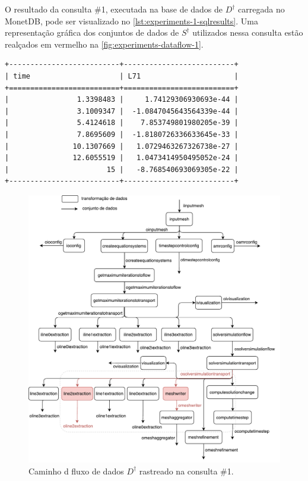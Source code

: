 O resultado da consulta \#1, executada na base de dados de \(D^{\dagger}\) carregada no MonetDB, pode ser visualizado no \autoref{lst:experiments-1-sqlresults}. Uma representação gráfica dos conjuntos de dados de \(S^{\dagger}\) utilizados nessa consulta estão realçados em vermelho na \autoref{fig:experiments-dataflow-1}.

\begin{minipage}[c]{0.95\textwidth}
\begin{lstlisting}[language=sqlresults,label={lst:experiments-1-sqlresults},caption={[Resultados da consulta \#1.]Resultados da consulta \#1 (7 tuplas, tempo médio: 4,346~ms).}]
+--------------------------+--------------------------+
| time                     | L71                      |
+==========================+==========================+
|                1.3398483 |     1.74129306930693e-44 |
|                3.1009347 |  -1.0847045643564339e-44 |
|                5.4124618 |    7.853749801980205e-39 |
|                7.8695609 |  -1.8180726336633645e-33 |
|               10.1307669 |   1.0729463267326738e-27 |
|               12.6055519 |   1.0473414950495052e-24 |
|                       15 |   -8.768540693069305e-22 |
+--------------------------+--------------------------+
\end{lstlisting}
\end{minipage}

\begin{figure}[htb]
    \centering
    \includegraphics[width=\textwidth]{img/experiments-dataflow-1}
    \caption[Caminho do fluxo de dados \(D^{\dagger}\) rastreado na consulta \#1]{Caminho d fluxo de dados \(D^{\dagger}\) rastreado na consulta \#1.}%
    \label{fig:experiments-dataflow-1}
\end{figure}


